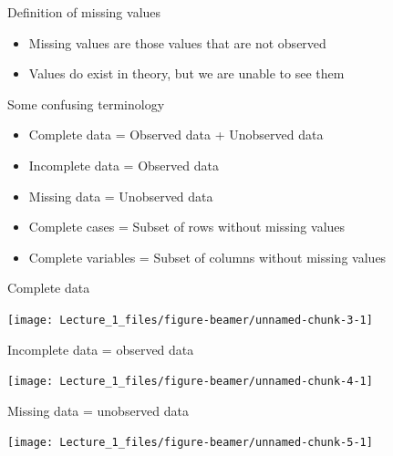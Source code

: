 \documentclass[ignorenonframetext,aspectratio=43]{beamer}
\providecommand{\tightlist}{%
  \setlength{\itemsep}{0pt}\setlength{\parskip}{0pt}}
\begin{document}
\begin{frame}{Definition of missing values}
\protect\hypertarget{definition-of-missing-values}{}

\begin{itemize}
\tightlist
\item
  Missing values are those values that are not observed
\item
  Values do exist in theory, but we are unable to see them
\end{itemize}

\end{frame}

\begin{frame}{Some confusing terminology}
\protect\hypertarget{some-confusing-terminology}{}

\begin{itemize}
\tightlist
\item
  Complete data = Observed data + Unobserved data
\item
  Incomplete data = Observed data
\item
  Missing data = Unobserved data
\item
  Complete cases = Subset of rows without missing values
\item
  Complete variables = Subset of columns without missing values
\end{itemize}

\end{frame}

\begin{frame}{Complete data}
\protect\hypertarget{complete-data}{}

\begin{center}\texttt{[image: Lecture\_1\_files/figure-beamer/unnamed-chunk-3-1]} \end{center}

\end{frame}

\begin{frame}{Incomplete data = observed data}
\protect\hypertarget{incomplete-data-observed-data}{}

\begin{center}\texttt{[image: Lecture\_1\_files/figure-beamer/unnamed-chunk-4-1]} \end{center}

\end{frame}

\begin{frame}{Missing data = unobserved data}
\protect\hypertarget{missing-data-unobserved-data}{}

\begin{center}\texttt{[image: Lecture\_1\_files/figure-beamer/unnamed-chunk-5-1]} \end{center}

\end{frame}
\end{document}
